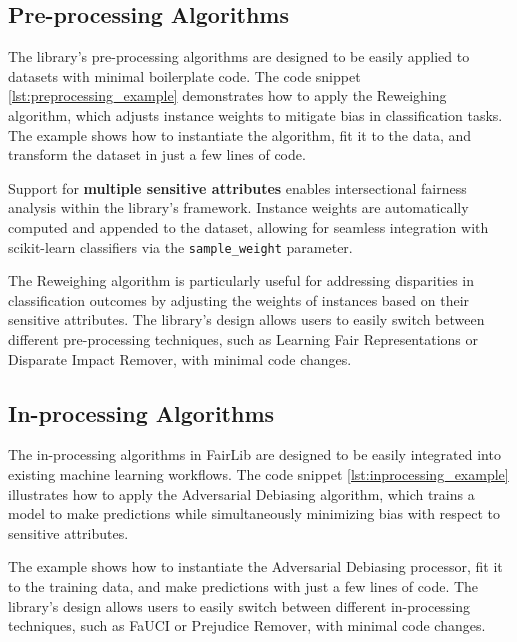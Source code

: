 \documentclass[12pt,a4paper,openright,twoside]{book}
\begin{document}
\subsection{Pre-processing Algorithms}
The library's pre-processing algorithms are designed to be easily applied to datasets with minimal boilerplate code. The code snippet \ref{lst:preprocessing_example} demonstrates how to apply the Reweighing algorithm, which adjusts instance weights to mitigate bias in classification tasks. The example shows how to instantiate the algorithm, fit it to the data, and transform the dataset in just a few lines of code.



Support for \textbf{multiple sensitive attributes} enables intersectional fairness analysis within the library’s framework. Instance weights are automatically computed and appended to the dataset, allowing for seamless integration with scikit-learn classifiers via the \texttt{sample\_weight} parameter.

The Reweighing algorithm is particularly useful for addressing disparities in classification outcomes by adjusting the weights of instances based on their sensitive attributes. The library's design allows users to easily switch between different pre-processing techniques, such as Learning Fair Representations or Disparate Impact Remover, with minimal code changes.

\subsection{In-processing Algorithms}
The in-processing algorithms in FairLib are designed to be easily integrated into existing machine learning workflows. The code snippet \ref{lst:inprocessing_example} illustrates how to apply the Adversarial Debiasing algorithm, which trains a model to make predictions while simultaneously minimizing bias with respect to sensitive attributes.



The example shows how to instantiate the Adversarial Debiasing processor, fit it to the training data, and make predictions with just a few lines of code. The library's design allows users to easily switch between different in-processing techniques, such as FaUCI or Prejudice Remover, with minimal code changes.
\end{document}
